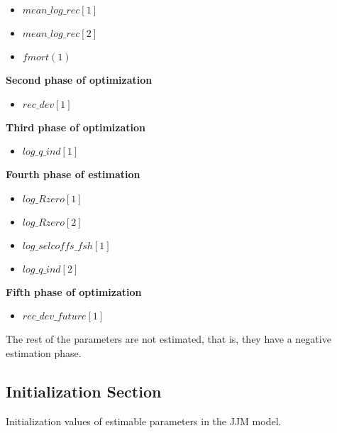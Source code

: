 \documentclass{article}
\begin{document}
\begin{itemize}
    \item $mean\_log\_rec[1]$
    \item $mean\_log\_rec[2]$
    \item $fmort(1)$
\end{itemize}

\textbf{Second phase of optimization}
\begin{itemize}
    \item $rec\_dev[1]$
\end{itemize}

\textbf{Third phase of optimization}
\begin{itemize}
    \item $log\_q\_ind[1]$
\end{itemize}
\textbf{Fourth phase of estimation}
\begin{itemize}
    \item $log\_Rzero[1]$
    \item $log\_Rzero[2]$
    \item $log\_selcoffs\_fsh[1]$
    \item $log\_q\_ind[2]$
\end{itemize}

\textbf{Fifth phase of optimization}
\begin{itemize}
    \item $rec\_dev\_future[1]$
\end{itemize}

The rest of the parameters are not estimated, that is, they have a negative estimation phase.

\subsection{Initialization Section}
Initialization values of estimable parameters in the JJM model.
\end{document}
